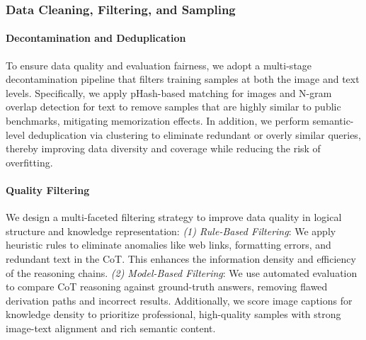 \documentclass{article}
\begin{document}
\subsubsection{Data Cleaning, Filtering, and Sampling}


\paragraph{Decontamination and Deduplication}
To ensure data quality and evaluation fairness, we adopt a multi-stage decontamination pipeline that filters training samples at both the image and text levels. Specifically, we apply pHash-based matching for images and N-gram overlap detection for text to remove samples that are highly similar to public benchmarks, mitigating memorization effects. In addition, we perform semantic-level deduplication via clustering to eliminate redundant or overly similar queries, thereby improving data diversity and coverage while reducing the risk of overfitting.



\paragraph{Quality Filtering}
We design a multi-faceted filtering strategy to improve data quality in logical structure and knowledge representation:
\textit{(1) Rule-Based Filtering}: We apply heuristic rules to eliminate anomalies like web links, formatting errors, and redundant text in the CoT. This enhances the information density and efficiency of the reasoning chains.
\textit{(2) Model-Based Filtering}: We use automated evaluation to compare CoT reasoning against ground-truth answers, removing flawed derivation paths and incorrect results. Additionally, we score image captions for knowledge density to prioritize professional, high-quality samples with strong image-text alignment and rich semantic content.
\end{document}
